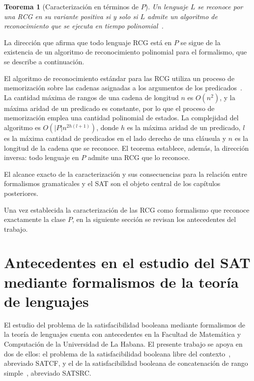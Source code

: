 \documentclass{report}
\theoremstyle{definition}
\theoremstyle{plain}
\newtheorem{teorema}{Teorema}[chapter]
\theoremstyle{remark}
\begin{document}
\begin{teorema}[Caracterización en términos de $P$]
\label{teo:prcg-ptime}
Un lenguaje $L$ se reconoce por una RCG en su variante positiva si y
solo si $L$ admite un algoritmo de reconocimiento que se ejecuta en
tiempo polinomial~\cite{bertsch2001rcg, boullier2000range}.
\end{teorema}

La dirección que afirma
que todo lenguaje RCG está en $P$ se sigue de la existencia de un
algoritmo de reconocimiento polinomial para el formalismo, que se
describe a continuación.

El algoritmo de reconocimiento estándar para las RCG utiliza un proceso
de memorización sobre las cadenas asignadas a los argumentos de los
predicados~\cite{boullier1998proposal}. La cantidad máxima de rangos de
una cadena de longitud $n$ es $O(n^2)$, y la máxima aridad de un predicado
es constante, por lo que el proceso de memorización emplea una cantidad
polinomial de estados. La complejidad del algoritmo es $O(|P|
n^{2h(l+1)})$, donde $h$ es la máxima aridad de un predicado, $l$ es
la máxima cantidad de predicados en el lado derecho de una cláusula y
$n$ es la longitud de la cadena que se reconoce. El teorema establece,
además, la dirección inversa: todo lenguaje en $P$ admite una RCG
que lo reconoce.

El alcance exacto
de la caracterización y sus consecuencias para la relación entre
formalismos gramaticales y el SAT son el objeto
central de los capítulos posteriores.

Una vez establecida la caracterización de las RCG como formalismo que
reconoce exactamente la clase $P$, en la siguiente sección se
revisan los antecedentes del trabajo.

\section{Antecedentes en el estudio del SAT mediante formalismos de la teoría de lenguajes}
\label{sec:antecedentes}

El estudio del problema de la satisfacibilidad booleana mediante
formalismos de la teoría de lenguajes cuenta con antecedentes en la
Facultad de Matemática y Computación de la Universidad de La Habana. El
presente trabajo se apoya en dos de ellos: el problema de la
satisfacibilidad booleana libre del contexto~\cite{fernandezarias2007},
abreviado SATCF, y el de la satisfacibilidad booleana de concatenación
de rango simple~\cite{aguileralopez2016}, abreviado SATSRC.
\end{document}
